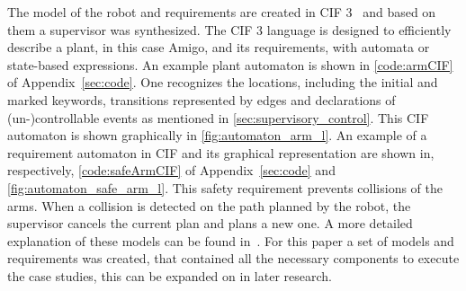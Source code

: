 The model of the robot and requirements are created in CIF 3~\cite{cif3} and based on them a supervisor was synthesized. 
The CIF 3 language is designed to efficiently describe a plant, in this case Amigo, and its requirements, with automata or state-based expressions.
An example plant automaton is shown in \cref{code:armCIF} of Appendix~\ref{sec:code}. 
One recognizes the locations, including the initial and marked keywords, transitions represented by edges and declarations of (un-)controllable events as mentioned in \cref{sec:supervisory_control}.
This CIF automaton is shown graphically in \cref{fig:automaton_arm_l}.
An example of a requirement automaton in CIF and its graphical representation are shown in, respectively, \cref{code:safeArmCIF} of Appendix~\ref{sec:code} and \cref{fig:automaton_safe_arm_l}.
This safety requirement prevents collisions of the arms.
When a collision is detected on the path planned by the robot, the supervisor cancels the current plan and plans a new one.
A more detailed explanation of these models can be found in~\cite{jorrit_github}.
For this paper a set of models and requirements was created, that contained all the necessary components to execute the case studies, this can be expanded on in later research.\\

